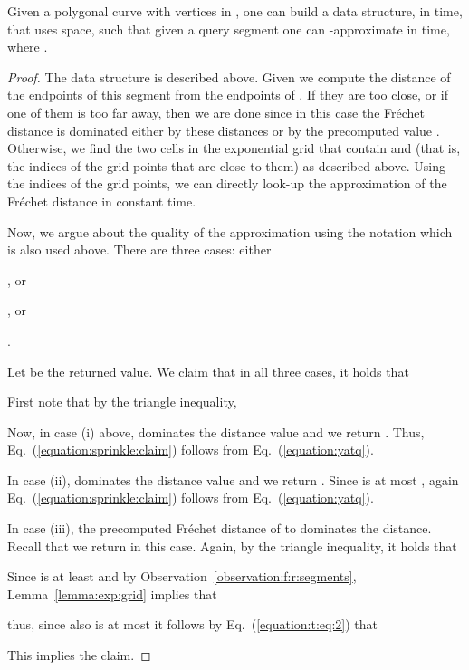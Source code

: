 \documentclass[12pt]{article}
\newcommand{\lemlab}[1]{\label{lemma:#1}}
\newcommand{\lemref}[1]{Lemma~\ref{lemma:#1}}
\newcommand{\Eqref}[1]{Eq.~(\ref{equation:#1})}
\newcommand{\obsref}[1]{Observation~\ref{observation:#1}}
\newcommand{\Frechet}{Fr\'{e}c{h}e{}t\xspace}\providecommand{\Arr}{\mathop{\mathrm{\EuScript{A}}}}
\numberwithin{figure}{section}
\numberwithin{equation}{section}
\begin{document}
\begin{lemma}
    \lemlab{epsilon:query:w:curve}Given a polygonal curve  with  vertices in , one
    can build a data structure, in  
    time, that uses  space, such that given a query segment 
    one can -approximate  in
     time, where .
\end{lemma}
\begin{proof}
    The data structure is described above. 
    Given  we compute the distance of the
    endpoints of this segment from the endpoints of . If they are too
    close, or if one of them is too far away, then we are done since in this
    case the \Frechet distance is dominated either by these distances or by the
    precomputed value .  Otherwise, we find the two cells in the exponential
    grid that contain  and  (that is, the indices of the grid
    points that are close to them) as described above. 
    Using the indices of the grid points, we can directly look-up the
    approximation of the \Frechet distance in constant time.
    
    Now, we argue about the quality of the approximation using the notation
    which is also used above. 
    There are three cases: either
    \begin{inparaenum}[(i)]
    \item , or
    \item , or
    \item .
    \end{inparaenum}
    Let  be the returned value. We claim that in all three cases, it
    holds that
    
    First note that by the triangle inequality, 
    
    Now, in case (i) above,  dominates the distance value and we return .
    Thus, \Eqref{sprinkle:claim} follows from \Eqref{yatq}.

    In case (ii),  dominates the distance value and we return
    . Since  is at most ,  again
     \Eqref{sprinkle:claim} follows from \Eqref{yatq}.

    In case (iii), the precomputed \Frechet distance of  to
     dominates the distance. Recall that we return 
      in
    this case.
    Again, by the triangle inequality, it holds
    that
    
    Since  is at least  and by \obsref{f:r:segments}, \lemref{exp:grid} implies that 
    
    thus, since also  is at most  it follows by \Eqref{t:eq:2} that 
    
    This implies the claim.
\end{proof}
\end{document}

